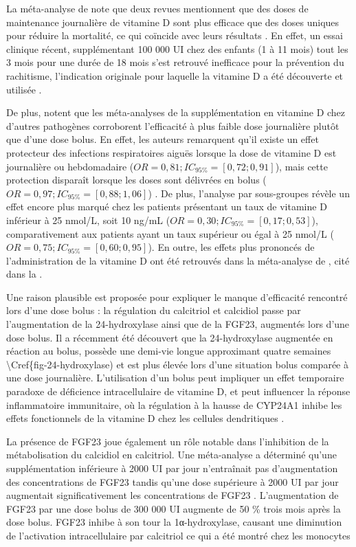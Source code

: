 \documentclass[
  a4paper,
  DIV=11,
  numbers=noendperiod,
  listof=totoc]{scrreprt}
\begin{document}
La méta-analyse de \textcite{Meng.2023} note que deux revues mentionnent
que des doses de maintenance journalière de vitamine D sont plus
efficace que des doses uniques pour réduire la mortalité, ce qui
coïncide avec leurs résultats \autocite{Griffin.2021,Mazess.2021}. En
effet, un essai clinique récent, supplémentant 100 000 UI chez des
enfants (1 à 11 mois) tout les 3 mois pour une durée de 18 mois s'est
retrouvé inefficace pour la prévention du rachitisme, l'indication
originale pour laquelle la vitamine D a été découverte et utilisée
\autocite{Crowe.2021}.

De plus, \textcite{Griffin.2021} notent que les méta-analyses de la
supplémentation en vitamine D chez d'autres pathogènes corroborent
l'efficacité à plus faible dose journalière plutôt que d'une dose bolus.
En effet, les auteurs remarquent qu'il existe un effet protecteur des
infections respiratoires aiguës lorsque la dose de vitamine D est
journalière ou hebdomadaire (\(OR = 0,81 ; IC_{95\%} = [0,72 ; 0,91]\)),
mais cette protection disparaît lorsque les doses sont délivrées en
bolus (\(OR = 0,97 ; IC_{95\%} = [0,88 ; 1,06]\))
\autocite{Martineau.2017}. De plus, l'analyse par sous-groupes révèle un
effet encore plus marqué chez les patients présentant un taux de
vitamine D inférieur à 25 nmol/L, soit 10 ng/mL
(\(OR = 0,30 ; IC_{95\%} = [0,17 ; 0,53]\)), comparativement aux
patients ayant un taux supérieur ou égal à 25 nmol/L
(\(OR = 0,75 ; IC_{95\%} = [0,60 ; 0,95]\)). En outre, les effets plus
prononcés de l'administration de la vitamine D ont été retrouvés dans la
méta-analyse de \textcite{Yang.2024}, cité dans la
.

Une raison plausible est proposée pour expliquer le manque d'efficacité
rencontré lors d'une dose bolus : la régulation du calcitriol et
calcidiol passe par l'augmentation de la 24-hydroxylase ainsi que de la
\ac{FGF23}, augmentés lors d'une dose bolus. Il a récemment été
découvert que la 24-hydroxylase augmentée en réaction au bolus, possède
une demi-vie longue approximant quatre semaines
\textbackslash Cref\{fig-24-hydroxylase) et est plus élevée lors d'une
situation bolus comparée à une dose journalière. L'utilisation d'un
bolus peut impliquer un effet temporaire paradoxe de déficience
intracellulaire de vitamine D, et peut influencer la réponse
inflammatoire immunitaire, où la régulation à la hausse de CYP24A1
inhibe les effets fonctionnels de la vitamine D chez les cellules
dendritiques \autocite{Griffin.2021,Ketha.2018}.

La présence de \ac{FGF23} joue également un rôle notable dans
l'inhibition de la métabolisation du calcidiol en calcitriol. Une
méta-analyse a déterminé qu'une supplémentation inférieure à 2000 UI par
jour n'entraînait pas d'augmentation des concentrations de \ac{FGF23}
tandis qu'une dose supérieure à 2000 UI par jour augmentait
significativement les concentrations de \ac{FGF23}
\autocite{Griffin.2021}. L'augmentation de \ac{FGF23} par une dose bolus
de 300 000 UI augmente de 50 \% trois mois après la dose bolus.
\ac{FGF23} inhibe à son tour la 1α-hydroxylase, causant une diminution
de l'activation intracellulaire par calcitriol ce qui a été montré chez
les monocytes \autocite{Griffin.2021}
\end{document}
